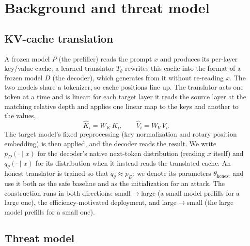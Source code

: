 \documentclass[11pt]{article}
\newcommand{\Tr}{T_{\theta}}
\begin{document}
\section{Background and threat model}

\subsection{KV-cache translation}

A frozen model $P$ (the prefiller) reads the prompt $x$ and produces its per-layer key/value
cache; a learned translator $\Tr$ rewrites this cache into the format of a frozen model $D$ (the
decoder), which generates from it without re-reading $x$. The two models share a tokenizer, so cache
positions line up. The translator acts one token at a time and is linear: for each target layer it reads the
source layer at the matching relative depth and applies one linear map to the keys and another to the values,
\begin{equation}
\hat K_i = W_K\,K_i, \qquad \hat V_i = W_V\,V_i .
\label{eq:translator}
\end{equation}
The target model's fixed preprocessing (key normalization and rotary position embedding) is then applied, and
the decoder reads the result. We write $p_D(\cdot\mid x)$ for the decoder's native next-token
distribution (reading $x$ itself) and $q_\theta(\cdot\mid x)$ for its distribution when it instead reads the
translated cache. An honest translator is trained so that $q_\theta\!\approx\!p_D$; we denote its
parameters $\theta_{\mathrm{honest}}$ and use it both as the safe baseline and as the initialization for an
attack. The construction runs in both directions: small$\to$large (a small model prefills for a large one), the efficiency-motivated
deployment, and large$\to$small (the large model prefills for a small one).

\subsection{Threat model}
\end{document}
